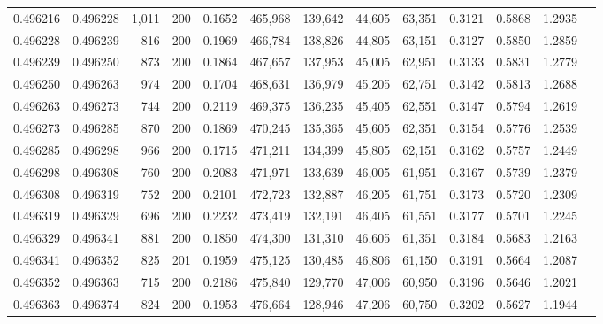 \begin{tabular}{rrrrrrrrrrrrr}
0.496216 & 0.496228 &  1,011 & 200 &                                     0.1652 & 465,968 & 139,642 &  44,605 &  63,351 & 0.3121 & 0.5868 & 1.2935 \\
0.496228 & 0.496239 &    816 & 200 &                                     0.1969 & 466,784 & 138,826 &  44,805 &  63,151 & 0.3127 & 0.5850 & 1.2859 \\
0.496239 & 0.496250 &    873 & 200 &                                     0.1864 & 467,657 & 137,953 &  45,005 &  62,951 & 0.3133 & 0.5831 & 1.2779 \\
0.496250 & 0.496263 &    974 & 200 &                                     0.1704 & 468,631 & 136,979 &  45,205 &  62,751 & 0.3142 & 0.5813 & 1.2688 \\
0.496263 & 0.496273 &    744 & 200 &                                     0.2119 & 469,375 & 136,235 &  45,405 &  62,551 & 0.3147 & 0.5794 & 1.2619 \\
0.496273 & 0.496285 &    870 & 200 &                                     0.1869 & 470,245 & 135,365 &  45,605 &  62,351 & 0.3154 & 0.5776 & 1.2539 \\
0.496285 & 0.496298 &    966 & 200 &                                     0.1715 & 471,211 & 134,399 &  45,805 &  62,151 & 0.3162 & 0.5757 & 1.2449 \\
0.496298 & 0.496308 &    760 & 200 &                                     0.2083 & 471,971 & 133,639 &  46,005 &  61,951 & 0.3167 & 0.5739 & 1.2379 \\
0.496308 & 0.496319 &    752 & 200 &                                     0.2101 & 472,723 & 132,887 &  46,205 &  61,751 & 0.3173 & 0.5720 & 1.2309 \\
0.496319 & 0.496329 &    696 & 200 &                                     0.2232 & 473,419 & 132,191 &  46,405 &  61,551 & 0.3177 & 0.5701 & 1.2245 \\
0.496329 & 0.496341 &    881 & 200 &                                     0.1850 & 474,300 & 131,310 &  46,605 &  61,351 & 0.3184 & 0.5683 & 1.2163 \\
0.496341 & 0.496352 &    825 & 201 &                                     0.1959 & 475,125 & 130,485 &  46,806 &  61,150 & 0.3191 & 0.5664 & 1.2087 \\
0.496352 & 0.496363 &    715 & 200 &                                     0.2186 & 475,840 & 129,770 &  47,006 &  60,950 & 0.3196 & 0.5646 & 1.2021 \\
0.496363 & 0.496374 &    824 & 200 &                                     0.1953 & 476,664 & 128,946 &  47,206 &  60,750 & 0.3202 & 0.5627 & 1.1944 \\

\end{tabular}

